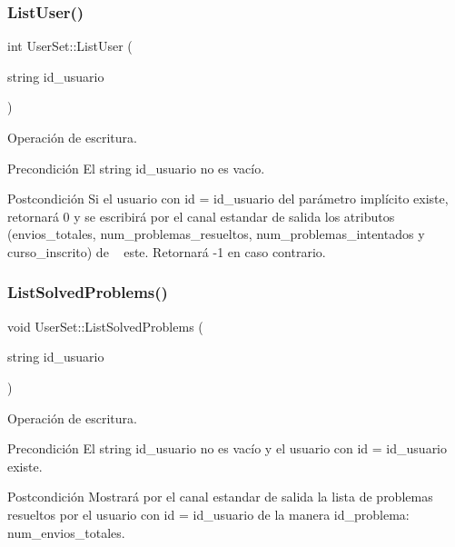 \subsubsection{\texorpdfstring{List\+User()}{ListUser()}}
{\footnotesize\ttfamily int User\+Set\+::\+List\+User (\begin{DoxyParamCaption}\item[{string}]{id\+\_\+usuario }\end{DoxyParamCaption})}



Operación de escritura. 

\begin{DoxyPrecond}{Precondición}
El string id\+\_\+usuario no es vacío. 
\end{DoxyPrecond}
\begin{DoxyPostcond}{Postcondición}
Si el usuario con id = id\+\_\+usuario del parámetro implícito existe, retornará 0 y se escribirá por el canal estandar de salida los atributos (envios\+\_\+totales, num\+\_\+problemas\+\_\+resueltos, num\+\_\+problemas\+\_\+intentados y curso\+\_\+inscrito) de ~\newline
 este. Retornará -\/1 en caso contrario. 
\end{DoxyPostcond}
\mbox{\label{class_user_set_afa40c2da0d1a67c7d7d6750e4e9cd78d}} 
\subsubsection{\texorpdfstring{List\+Solved\+Problems()}{ListSolvedProblems()}}
{\footnotesize\ttfamily void User\+Set\+::\+List\+Solved\+Problems (\begin{DoxyParamCaption}\item[{string}]{id\+\_\+usuario }\end{DoxyParamCaption})}



Operación de escritura. 

\begin{DoxyPrecond}{Precondición}
El string id\+\_\+usuario no es vacío y el usuario con id = id\+\_\+usuario existe. 
\end{DoxyPrecond}
\begin{DoxyPostcond}{Postcondición}
Mostrará por el canal estandar de salida la lista de problemas resueltos por el usuario con id = id\+\_\+usuario de la manera id\+\_\+problema\+: num\+\_\+envios\+\_\+totales. 
\end{DoxyPostcond}
\mbox{\label{class_user_set_a52e8ebe8033813cf5ad7d8b23d7eea4c}} 

